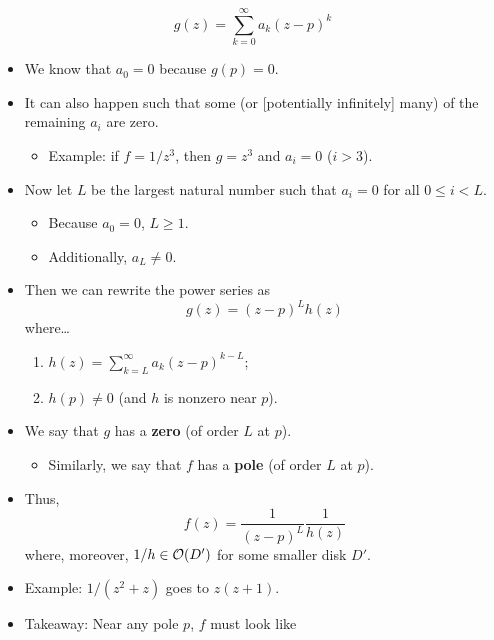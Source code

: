 \documentclass[../notes.tex]{subfiles}
\begin{document}
\begin{itemize}
    \begin{equation*}
        g(z) = \sum_{k=0}^\infty a_k(z-p)^k
    \end{equation*}
    \begin{itemize}
        \item We know that $a_0=0$ because $g(p)=0$.
        \item It can also happen such that some (or [potentially infinitely] many) of the remaining $a_i$ are zero.
        \begin{itemize}
            \item Example: if $f=1/z^3$, then $g=z^3$ and $a_i=0$ ($i>3$).
        \end{itemize}
        \item Now let $L$ be the largest natural number such that $a_i=0$ for all $0\leq i<L$.
        \begin{itemize}
            \item Because $a_0=0$, $L\geq 1$.
            \item Additionally, $a_L\neq 0$.
        \end{itemize}
        \item Then we can rewrite the power series as
        \begin{equation*}
            g(z) = (z-p)^Lh(z)
        \end{equation*}
        where\dots
        \begin{enumerate}
            \item $h(z)=\sum_{k=L}^\infty a_k(z-p)^{k-L}$;
            \item $h(p)\neq 0$ (and $h$ is nonzero near $p$).
        \end{enumerate}
        \item We say that $g$ has a \textbf{zero} (of order $L$ at $p$).
        \begin{itemize}
            \item Similarly, we say that $f$ has a \textbf{pole} (of order $L$ at $p$).
        \end{itemize}
        \item Thus,
        \begin{equation*}
            f(z) = \frac{1}{(z-p)^L}\frac{1}{h(z)}
        \end{equation*}
        where, moreover, $1/h\in\mathcal{O}(D')$ for some smaller disk $D'$.
        \item Example: $1/(z^2+z)$ goes to $z(z+1)$.
        \item Takeaway: Near any pole $p$, $f$ must look like

\end{itemize}
\end{itemize}
\end{document}
